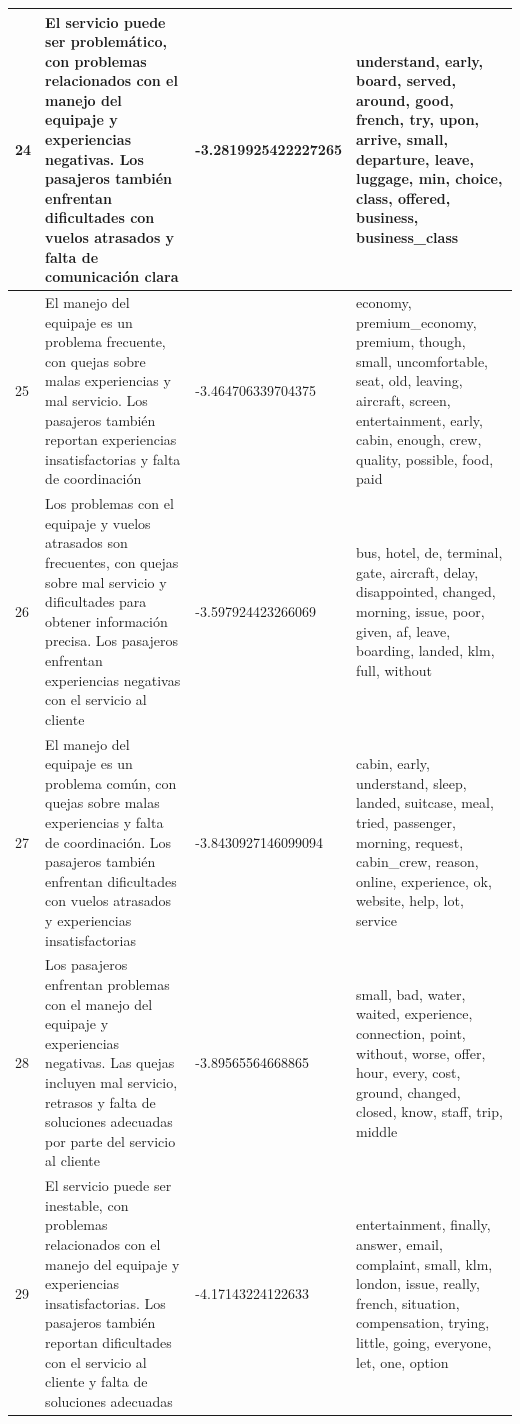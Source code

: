 \documentclass{report}
\begin{document}
\begin{longtable}{|p{1cm}|p{4cm}|p{4cm}|p{6cm}|}
                    \hline
                    24 & El servicio puede ser problemático, con problemas relacionados con el manejo del equipaje y experiencias negativas. Los pasajeros también enfrentan dificultades con vuelos atrasados y falta de comunicación clara & -3.2819925422227265 & understand, early, board, served, around, good, french, try, upon, arrive, small, departure, leave, luggage, min, choice, class, offered, business, business\_class \\
                    \hline
                    25 & El manejo del equipaje es un problema frecuente, con quejas sobre malas experiencias y mal servicio. Los pasajeros también reportan experiencias insatisfactorias y falta de coordinación & -3.464706339704375 & economy, premium\_economy, premium, though, small, uncomfortable, seat, old, leaving, aircraft, screen, entertainment, early, cabin, enough, crew, quality, possible, food, paid \\
                    \hline
                    26 & Los problemas con el equipaje y vuelos atrasados son frecuentes, con quejas sobre mal servicio y dificultades para obtener información precisa. Los pasajeros enfrentan experiencias negativas con el servicio al cliente & -3.597924423266069 & bus, hotel, de, terminal, gate, aircraft, delay, disappointed, changed, morning, issue, poor, given, af, leave, boarding, landed, klm, full, without \\
                    \hline
                    27 & El manejo del equipaje es un problema común, con quejas sobre malas experiencias y falta de coordinación. Los pasajeros también enfrentan dificultades con vuelos atrasados y experiencias insatisfactorias & -3.8430927146099094 & cabin, early, understand, sleep, landed, suitcase, meal, tried, passenger, morning, request, cabin\_crew, reason, online, experience, ok, website, help, lot, service \\
                    \hline
                    28 & Los pasajeros enfrentan problemas con el manejo del equipaje y experiencias negativas. Las quejas incluyen mal servicio, retrasos y falta de soluciones adecuadas por parte del servicio al cliente & -3.89565564668865 & small, bad, water, waited, experience, connection, point, without, worse, offer, hour, every, cost, ground, changed, closed, know, staff, trip, middle \\
                    \hline
                    29 & El servicio puede ser inestable, con problemas relacionados con el manejo del equipaje y experiencias insatisfactorias. Los pasajeros también reportan dificultades con el servicio al cliente y falta de soluciones adecuadas & -4.17143224122633 & entertainment, finally, answer, email, complaint, small, klm, london, issue, really, french, situation, compensation, trying, little, going, everyone, let, one, option \\

\end{longtable}
\end{document}
